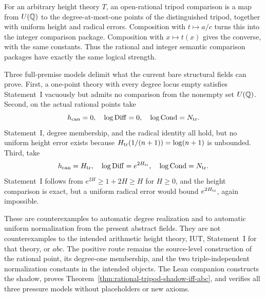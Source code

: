 For an arbitrary height theory $T$, an open-rational tripod comparison is a
map from $U(\mathbb Q)$ to the degree-at-most-one points of the distinguished tripod,
together with uniform height and radical errors.  Composition with
$t\mapsto a/c$ turns this into the integer comparison package.  Composition
with $x\mapsto t(x)$ gives the converse, with the same constants.  Thus the
rational and integer semantic comparison packages have exactly the same
logical strength.

Three full-premise models delimit what the current bare structural fields can
prove.  First, a one-point theory with every degree locus empty satisfies
Statement~I vacuously but admits no comparison from the nonempty set $U(\mathbb Q)$.
Second, on the actual rational points take
\[
 h_{\rm can}=0,
 \quad\log\mathrm{Diff}=0,
 \quad\log\mathrm{Cond}=N_{\rm tr}.
\]
Statement~I, degree membership, and the radical identity all hold, but no
uniform height error exists because $H_{\rm tr}(1/(n+1))=\log(n+1)$ is
unbounded.  Third, take
\[
 h_{\rm can}=H_{\rm tr},
 \quad\log\mathrm{Diff}=e^{2H_{\rm tr}},
 \quad\log\mathrm{Cond}=N_{\rm tr}.
\]
Statement~I follows from $e^{2H}\ge1+2H\ge H$ for $H\ge0$, and the height
comparison is exact, but a uniform radical error would bound
$e^{2H_{\rm tr}}$, again impossible.

These are counterexamples to automatic degree realization and to automatic
uniform normalization from the present abstract fields.  They are not
counterexamples to the intended arithmetic height theory, IUT, Statement~I
for that theory, or $abc$.  The positive route remains the source-level
construction of the rational point, its degree-one membership, and the two
triple-independent normalization constants in the intended objects.  The
Lean companion constructs the shadow, proves
Theorem~\ref{thm:rational-tripod-shadow-iff-abc}, and verifies all three
pressure models without placeholders or new axioms.
